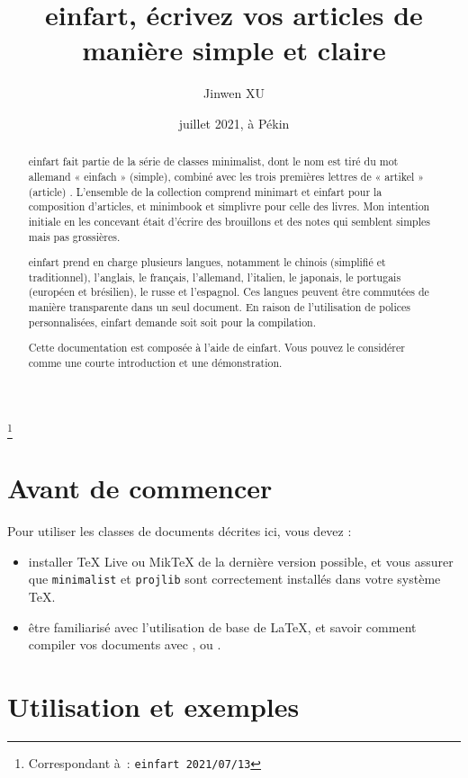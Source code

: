 \documentclass[English,Chinese,French,puretext]{einfart}
\providecommand{\minimalist}{\textsf{minimalist}}
\providecommand{\minimart}{\textsf{minimart}}
\providecommand{\minimbook}{\textsf{minimbook}}
\providecommand{\einfart}{\textsf{einfart}}
\providecommand{\simplivre}{\textsf{simplivre}}
\let\LevelOneTitle\section
\begin{document}
\title{\einfart{}, écrivez vos articles de manière simple et claire}
\author{Jinwen XU}
\thanks{Correspondant à : \texttt{\einfart{} 2021/07/13}}
\date{juillet 2021, à Pékin}

\maketitle

\begin{abstract}
    \einfart{} fait partie de la série de classes \minimalist{}, dont le nom est tiré du mot allemand « einfach » (simple), combiné avec les trois premières lettres de « artikel » (article) . L'ensemble de la collection comprend \minimart{} et \einfart{} pour la composition d'articles, et \minimbook{} et \simplivre{} pour celle des livres. Mon intention initiale en les concevant était d'écrire des brouillons et des notes qui semblent simples mais pas grossières.

    \einfart{} prend en charge plusieurs langues, notamment le chinois (simplifié et traditionnel), l'anglais, le français, l'allemand, l'italien, le japonais, le portugais (européen et brésilien), le russe et l'espagnol. Ces langues peuvent être commutées de manière transparente dans un seul document. En raison de l'utilisation de polices personnalisées, \einfart{} demande soit  soit  pour la compilation.

    Cette documentation est composée à l'aide de \einfart{}. Vous pouvez le considérer comme une courte introduction et une démonstration.
\end{abstract}


\setcounter{tocdepth}{2}
\tableofcontents


\LevelOneTitle*{Avant de commencer}

Pour utiliser les classes de documents décrites ici, vous devez :
\begin{itemize}
      \item installer TeX Live ou MikTeX de la dernière version possible, et vous assurer que \texttt{minimalist} et \texttt{projlib} sont correctement installés dans votre système \TeX{}.
      \item être familiarisé avec l'utilisation de base de \LaTeX{}, et savoir comment compiler vos documents avec ,  ou .
\end{itemize}


\LevelOneTitle{Utilisation et exemples}
\end{document}
